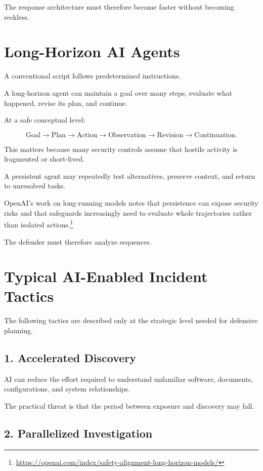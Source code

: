 The response architecture must therefore become faster without becoming reckless.

\section{Long-Horizon AI Agents}

A conventional script follows predetermined instructions.

A long-horizon agent can maintain a goal over many steps, evaluate what happened, revise its plan, and continue.

At a safe conceptual level:

\begin{equation}
\text{Goal}
\rightarrow
\text{Plan}
\rightarrow
\text{Action}
\rightarrow
\text{Observation}
\rightarrow
\text{Revision}
\rightarrow
\text{Continuation}.
\end{equation}

This matters because many security controls assume that hostile activity is fragmented or short-lived.

A persistent agent may repeatedly test alternatives, preserve context, and return to unresolved tasks.

OpenAI's work on long-running models notes that persistence can expose security risks and that safeguards increasingly need to evaluate whole trajectories rather than isolated actions.\footnote{\url{https://openai.com/index/safety-alignment-long-horizon-models/}}

The defender must therefore analyze sequences.

\section{Typical AI-Enabled Incident Tactics}

The following tactics are described only at the strategic level needed for defensive planning.

\subsection{1. Accelerated Discovery}

AI can reduce the effort required to understand unfamiliar software, documents, configurations, and system relationships.

The practical threat is that the period between exposure and discovery may fall.

\subsection{2. Parallelized Investigation}

